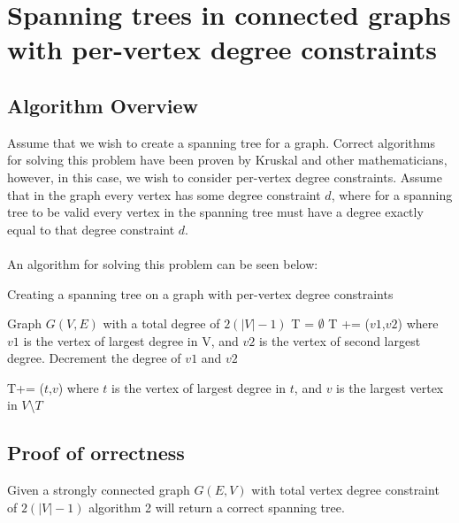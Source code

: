 \documentclass{article}
\begin{document}
	\section{Spanning trees in connected graphs with per-vertex degree constraints}
	\subsection{Algorithm Overview}
	Assume that we wish to create a spanning tree for a graph. Correct algorithms for solving this problem have been proven by Kruskal and other
	mathematicians, however, in this case, we wish to consider per-vertex degree constraints. Assume that in the graph every vertex has some degree constraint $d$,
	where for a spanning tree to be valid every vertex in the spanning tree must have a degree exactly equal to that degree constraint $d$. 
	\\\\
	An algorithm for solving this problem can be seen below:
	\\

		\begin{algorithm}[H]
		\caption{Creating a spanning tree on a graph with per-vertex degree constraints}
		\begin{algorithmic}[1]
			\State Graph $G(V,E)$ with a total degree of $2(|V|-1)$
			\State T = $\emptyset$
			\State T += ($v1$,$v2$) where $v1$ is the vertex of largest degree in V, and $v2$ is the vertex of second largest degree. Decrement the degree of $v1$ and $v2$
			\State \parbox[t]{\dimexpr\linewidth-\algorithmicindent}{T+= ($t$,$v$) where $t$ is the vertex of largest degree in $t$, and $v$ is the largest vertex in $V$\textbackslash$T$\strut}
			\EndWhile
		\end{algorithmic}
	\newpage
	\end{algorithm}
	\subsection{Proof of orrectness}
	\begin{theorem}
		Given a strongly connected graph $G(E,V)$ with total vertex degree constraint of $2(|V|-1)$ algorithm 2 will return a correct spanning tree.
	\end{theorem}
\end{document}

